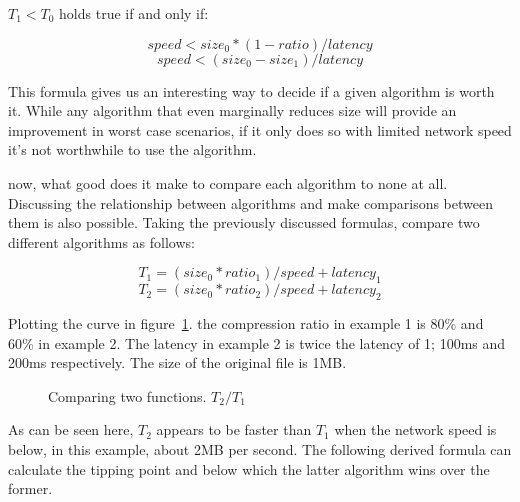 \documentclass[11pt,a4paper]{report}
\begin{document}
$T_1 < T_0$ holds true if and only if:

\begin{equation}
\label{networkspeedmin} speed < size_0 * (1 - ratio) / latency
\end{equation}
\begin{equation}
speed < (size_0 - size_1) / latency
\end{equation}

This formula gives us an interesting way to decide if a given algorithm is worth it. While any algorithm that even marginally reduces size will provide an improvement in worst case scenarios, if it only does so with limited network speed it's not worthwhile to use the algorithm.

now, what good does it make to compare each algorithm to none at all. Discussing the relationship between algorithms and make comparisons between them is also possible. Taking the previously discussed formulas, compare two different algorithms as follows:

\begin{equation}
T_1 = (size_0 * ratio_1) / speed + latency_1
\end{equation}
\begin{equation}
T_2 = (size_0 * ratio_2) / speed + latency_2
\end{equation}

Plotting the curve in figure~\ref{fig:CurveNetworkLimitationSpeedTwo}. the compression ratio in example 1 is 80\% and 60\% in example 2. The latency in example 2 is twice the latency of 1; 100ms and 200ms respectively. The size of the original file is 1MB. 

\begin{figure}[ht!]
    \centering
{}
\caption{
\label{fig:CurveNetworkLimitationSpeedTwo} Comparing two functions. $T_2 / T_1$}
\end{figure}

As can be seen here, $T_2$ appears to be faster than $T_1$ when the network speed is below, in this example, about 2MB per second. The following derived formula can calculate the tipping point and below which the latter algorithm wins over the former.
\end{document}
